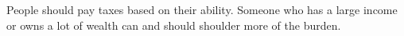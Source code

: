 People should pay taxes based on their ability.
Someone who has a large income or owns a lot of wealth can and should shoulder more of the burden.